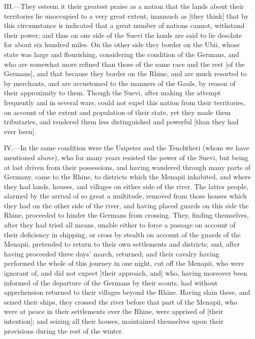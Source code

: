 III.—They esteem it their greatest praise as a nation that the lands
about their territories lie unoccupied to a very great extent, inasmuch
as [they think] that by this circumstance is indicated that a great
number of nations cannot, withstand their power; and thus on one side of
the Suevi the lands are said to lie desolate for about six hundred
miles. On the other side they border on the Ubii, whose state was large
and flourishing, considering the condition of the Germans, and who are
somewhat more refined than those of the same race and the rest [of the
Germans], and that because they border on the Rhine, and are much
resorted to by merchants, and are accustomed to the manners of the
Gauls, by reason of their approximity to them. Though the Suevi, after
making the attempt frequently and in several wars, could not expel this
nation from their territories, on account of the extent and population
of their state, yet they made them tributaries, and rendered them less
distinguished and powerful [than they had ever been].

IV.—In the same condition were the Usipetes and the Tenchtheri (whom we
have mentioned above), who for many years resisted the power of the
Suevi, but being at last driven from their possessions, and having
wandered through many parts of Germany, came to the Rhine, to districts
which the Menapii inhabited, and where they had lands, houses, and
villages on either side of the river. The latter people, alarmed by the
arrival of so great a multitude, removed from those houses which they
had on the other side of the river, and having placed guards on this
side the Rhine, proceeded to hinder the Germans from crossing. They,
finding themselves, after they had tried all means, unable either to
force a passage on account of their deficiency in shipping, or cross by
stealth on account of the guards of the Menapii, pretended to return to
their own settlements and districts; and, after having proceeded three
days' march, returned; and their cavalry having performed the whole of
this journey in one night, cut off the Menapii, who were ignorant of,
and did not expect [their approach, and] who, having moreover been
informed of the departure of the Germans by their scouts, had without
apprehension returned to their villages beyond the Rhine. Having slain
these, and seized their ships, they crossed the river before that part
of the Menapii, who were at peace in their settlements over the Rhine,
were apprised of [their intention]; and seizing all their houses,
maintained themselves upon their provisions during the rest of the
winter.

